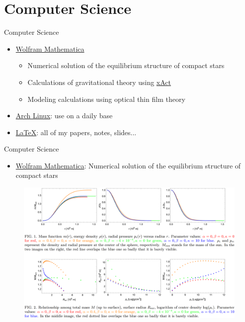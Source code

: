\documentclass[9pt,aspectratio=169,hyperref=colorlinks]{beamer}
\begin{document}
\section{Computer Science}
\begin{frame}{Computer Science}
    \begin{itemize}
        \item \href{https://www.wolfram.com/mathematica/}{Wolfram Mathematica} \begin{itemize}
            \item Numerical solution of the equilibrium structure of compact stars
            \item Calculations of gravitational theory using \href{http://xact.es/index.html}{xAct}
            \item Modeling calculations using optical thin film theory
        \end{itemize}
        \item \href{https://archlinux.org}{Arch Linux}: use on a daily base
        \item \href{https://www.latex-project.org}{\LaTeX}: all of my papers, notes, slides...
    \end{itemize}
\end{frame}

\begin{frame}{Computer Science}
    \begin{itemize}
        \item \href{https://www.wolfram.com/mathematica/}{Wolfram Mathematica}: Numerical solution of the equilibrium structure of compact stars
    \end{itemize}

    \begin{figure}
        \centering
        \includegraphics[scale=0.2]{CV/figs/2210.01574.png}
    \end{figure}
\end{frame}
\end{document}
